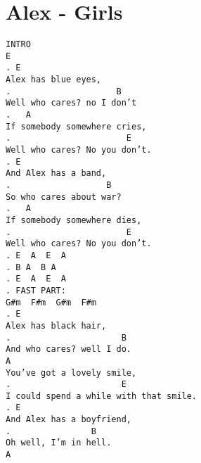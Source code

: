 \newpage
\section{Alex - Girls}
\label{Alex - Girls}
\texttt{INTRO\\
E\\
.\
E\\
Alex\ has\ blue\ eyes,\ \\
. \ \ \ \ \ \ \ \ \ \ \ \ \ \ \ \ \ \ \ \ B\\
Well\ who\ cares?\ no\ I\ don't\\
. \ \ A\\
If\ somebody\ somewhere\ cries,\ \\
. \ \ \ \ \ \ \ \ \ \ \ \ \ \ \ \ \ \ \ \ \ \ E\\
Well\ who\ cares?\ No\ you\ don't.\\
.\
E\\
And\ Alex\ has\ a\ band,\ \\
. \ \ \ \ \ \ \ \ \ \ \ \ \ \ \ \ \ \ B\\
So\ who\ cares\ about\ war?\\
. \ \ A\\
If\ somebody\ somewhere\ dies,\ \\
. \ \ \ \ \ \ \ \ \ \ \ \ \ \ \ \ \ \ \ \ \ \ E\\
Well\ who\ cares?\ No\ you\ don't.\\
.\
E\ \ A\ \ E\ \ A\ \ \\
.\
B\ A\ \ B\ A\\
.\
E\ \ A\ \ E\ \ A\ \ \\
.\
FAST\ PART:\\
G\#m\ \ F\#m\ \ G\#m\ \ F\#m\\
.\
E\\
Alex\ has\ black\ hair,\ \\
. \ \ \ \ \ \ \ \ \ \ \ \ \ \ \ \ \ \ \ \ \ B\\
And\ who\ cares?\ well\ I\ do.\\
A\\
You've\ got\ a\ lovely\ smile,\ \\
. \ \ \ \ \ \ \ \ \ \ \ \ \ \ \ \ \ \ \ \ \ E\\
I\ could\ spend\ a\ while\ with\ that\ smile.\\
.\
E\\
And\ Alex\ has\ a\ boyfriend,\ \\
. \ \ \ \ \ \ \ \ \ \ \ \ \ \ \ B\\
Oh\ well,\ I'm\ in\ hell.\\
A\\
}
